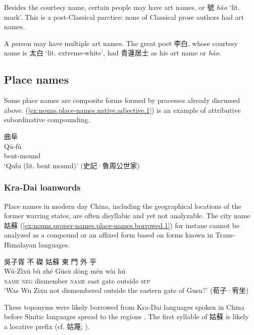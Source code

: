 \documentclass[UTF8, a4paper, oneside, scheme=plain, 12pt]{ctexrep}
\newcommand{\form}[1]{\emph{#1}}
\newcommand{\translate}[1]{`#1'}
\newcommand*{\category}[1]{\textsc{#1}}
\begin{document}
Besides the courtesy name, certain people may have art names,
or 號 \form{hào} \translate{lit. mark}.
This is a post-Classical parctice:
none of Classical prose authors had art names.

A person may have multiple art names.
The great poet 李白, whose courtesy name is 太白 \translate{lit. extreme-white},
had 青蓮居士 as his art name or \form{hào}.

\subsection{Place names}

Some place names are composite forms formed by processes already discussed above.
(\ref{ex:nouns.place-names.native.adjective.1}) is an example of attributive subordinative compounding.

\begin{exe}
    \ex\label{ex:nouns.place-names.native.adjective.1}
    \glll 曲阜 \\
    Qū-fù \\
    bent-mound \\
    \glt\translate{Qufu (lit. bent mound)} \hfill (史記·魯周公世家)
\end{exe}

\subsubsection{Kra-Dai loanwords}\label{sec:nouns.proper-names.place-names.kra-dai}

Place names in modern day China, including the geographical locations of the former warring states,
are often disyllabic and yet not analyzable.
The city name 姑蘇 (\ref{ex:nouns.proper-names.place-names.borrowed.1})
for instane cannot be analyzed as a compound or an affixed form
based on forms known in Trans-Himalayan languages.

\begin{exe}
    \ex\label{ex:nouns.proper-names.place-names.borrowed.1}
    \glll 吳子胥 不 磔 姑蘇 東 門 外 乎 \\
    Wú-Zǐxū bù zhé Gūsū dōng mén wài hū \\
    \category{name} \category{neg} dismember \category{name} east gate outside \category{sfp} \\
    \glt\translate{Was Wu Zixu not dismembered outside the eastern gate of Gusu?} \hfill (荀子·宥坐)
\end{exe}

These toponyms were likely borrowed from Kra-Dai languages spoken in China 
before Sinitic languages spread to the regions \citep{zhengzhang1990kradai,zhengzhang1996kradai}.
The first syllable of 姑蘇 is likely a locative prefix
(cf. 姑蔑; \citealt{zhengzhang1996kradai}).
\end{document}
